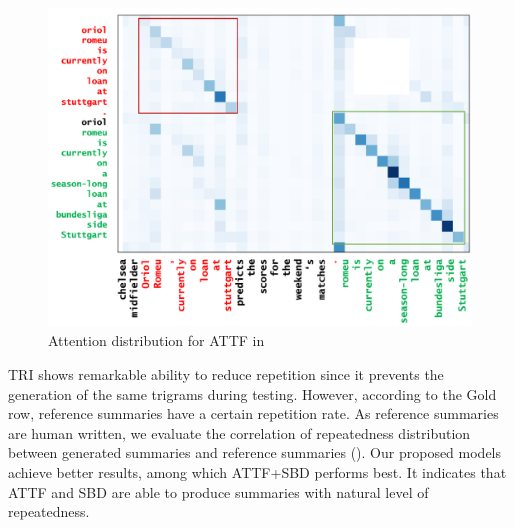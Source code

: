 \begin{figure}[th!]
\centering
\includegraphics[width=0.8\linewidth]{map3}
\caption{Attention distribution for ATTF in }
\label{fig:attn_map3}
\end{figure}


TRI shows remarkable ability to reduce repetition since it prevents the generation of the same trigrams during testing. 
However, according to the Gold row, reference summaries have a certain repetition rate.
As reference summaries are human written, we evaluate the correlation of repeatedness distribution between
generated summaries and reference summaries ().
Our proposed models achieve better results, among which ATTF+SBD performs best.
It indicates that ATTF and SBD are able to produce summaries with natural level of repeatedness.

